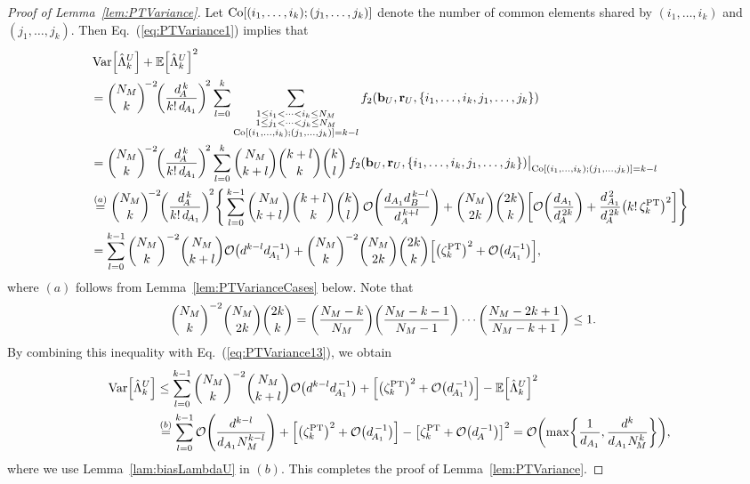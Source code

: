 \documentclass[aps,prl,twocolumn,nofootinbib,superscriptaddress,10pt]{revtex4-2}
\let\originalleft\left
\let\originalright\right
\renewcommand{\left}{\mathopen{}\mathclose\bgroup\originalleft}
\renewcommand{\right}{\aftergroup\egroup\originalright}
\def\E{ {\mathbb E} } %
\DeclareMathOperator{\Var}{Var}
\newcommand{\bigo}[1]{\mathcal{O}\left(#1\right)}
\theoremstyle{plain}
\theoremstyle{definition}
\newcommand{\PT}{\mathrm{PT}}
\newcommand{\eref}[1]{Eq.~\textup{(\ref{#1})}}
\newcommand{\lref}[1]{Lemma~\ref{#1}}
\begin{document}
\begin{proof}[Proof of \lref{lem:PTVariance}]
Let ${\rm Co}[(i_1,\dots,i_k);(j_1,\dots,j_k)]$ denote the number of common elements shared by $(i_1,\dots,i_k)$ and $(j_1,\dots,j_k)$. Then \eref{eq:PTVariance1}  implies that 
\begin{align}\label{eq:PTVariance13} 
&\Var\left[ \hat{\Lambda}_k^{U} \right] +\E\left[ \hat{\Lambda}_k^{U}  \right]^2
\nonumber\\
&= \binom{N_M}{k}^{\!-2} \!\left( \frac{d_{\!A}^{\,k}}{k!\, d_{\!A_1} } \right)^{\!2} 
\sum_{l=0}^{k} 
\sum_{\substack{1\leq i_1<\dots<i_k\leq N_M \\ 1\leq j_1<\dots<j_k\leq N_M\\{\rm Co}[(i_1,\dots,i_k);(j_1,\dots,j_k)]=k-l}}
f_2\left( \mathbf{b}_{U},\mathbf{r}_{U},\left\lbrace i_1,\dots,i_k,j_1,\dots,j_k\right\rbrace \right)
\nonumber\\
&= \binom{N_M}{k}^{\!-2} \!\left( \frac{d_{\!A}^{\,k}}{k!\, d_{\!A_1} } \right)^{\!2} 
\sum_{l=0}^{k} 
\binom{N_M}{k+l} \binom{k+l}{k} \binom{k}{l} \,
f_2\left( \mathbf{b}_{U},\mathbf{r}_{U},\left\lbrace i_1,\dots,i_k,j_1,\dots,j_k\right\rbrace \right)\big|_{{\rm Co}[(i_1,\dots,i_k);(j_1,\dots,j_k)]=k-l}
\nonumber\\
&\stackrel{(a)}{=}\binom{N_M}{k}^{\!-2} \!\left( \frac{d_{\!A}^{\,k}}{k!\, d_{\!A_1} } \right)^{\!2} 
\left\lbrace \,  
\sum_{l=0}^{k-1} 
\binom{N_M}{k+l} \binom{k+l}{k} \binom{k}{l} \, 
\bigo{ \frac{d_{A_1} d_B^{\,k-l}}{d_A^{\,k+l} } } 
+   
\binom{N_M}{2k} \binom{2k}{k}
\left[\bigo{ \frac{d_{A_1}}{d_{\!A}^{\,2k}} }+ \frac{d_{A_1}^{\,2}}{d_{\!A}^{\,2k}} \left( k!\,\zeta_k^{\PT}\right)^2
\right]\right\rbrace 
\nonumber\\
&= 
\sum_{l=0}^{k-1}\binom{N_M}{k}^{-2}  
\binom{N_M}{k+l} \bigo{d^{k-l} d_{\!A_1}^{\,-1}}
+ 
\binom{N_M}{k}^{-2}  \binom{N_M}{2k}\binom{2k}{k} 
\left[\left( \zeta_k^{\PT}\right)^2
+ \bigo{d_{\!A_1}^{\,-1}}
\right],
\end{align}
where $(a)$ follows from \lref{lem:PTVarianceCases} below. 
Note that 
\begin{align} 
	\binom{N_M}{k}^{-2}  \binom{N_M}{2k}\binom{2k}{k}
	&= \left( \frac{N_M-k}{N_M}\right)  \left( \frac{N_M-k-1}{N_M-1}\right)  \cdots \left(\frac{N_M-2k+1}{N_M-k+1}\right) 
	\leq 1.
\end{align}
By combining this inequality with \eref{eq:PTVariance13}, we obtain 
\begin{align}\label{eq:PTVariance14} 
\Var\left[ \hat{\Lambda}_k^{U} \right] 
&\leq 
\sum_{l=0}^{k-1}\binom{N_M}{k}^{-2}  
\binom{N_M}{k+l} \bigo{d^{k-l} d_{\!A_1}^{\,-1}}
+ 
\left[\left( \zeta_k^{\PT}\right)^2
+ \bigo{d_{\!A_1}^{\,-1}}
\right] - \E\left[ \hat{\Lambda}_k^{U}  \right]^2
\nonumber\\
&\stackrel{(b)}{=}\sum_{l=0}^{k-1} \bigo{\frac{ d^{k-l}}{d_{A_1} N_M^{k-l}}}  
+ \left[\left( \zeta_k^{\PT}\right)^2+ \bigo{d_{\!A_1}^{\,-1}}\right] 
- \left[ \zeta_k^{\PT} + \bigo{d_{\!A}^{\,-1}} \right]^2
= \bigo{\max\left\lbrace \frac{1}{d_{A_1}} ,\frac{d^{k}}{d_{A_1} N_{\!M}^{k}}\right\rbrace  } , 
\end{align}
where we use \lref{lam:biasLambdaU} in $(b)$. 
This completes the proof of \lref{lem:PTVariance}. 
\end{proof}
\end{document}
